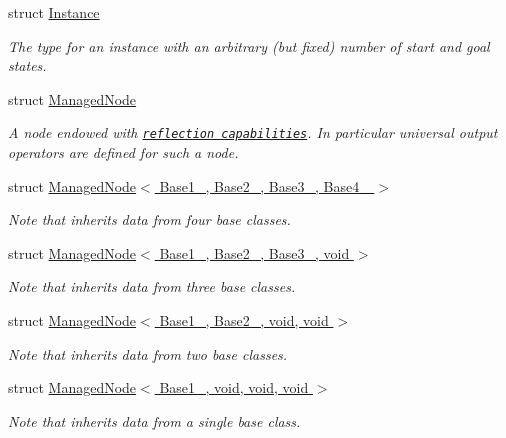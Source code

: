 \begin{DoxyCompactItemize}
struct \hyperlink{structslb_1_1core_1_1sb_1_1Instance}{Instance}
\begin{DoxyCompactList}\small\item\em The type for an instance with an arbitrary (but fixed) number of start and goal states. \end{DoxyCompactList}\item 
struct \hyperlink{structslb_1_1core_1_1sb_1_1ManagedNode}{Managed\+Node}
\begin{DoxyCompactList}\small\item\em A node endowed with \href{http://stackoverflow.com/a/11744832/2725810}{\tt reflection capabilities}. In particular universal output operators are defined for such a node. \end{DoxyCompactList}\item 
struct \hyperlink{structslb_1_1core_1_1sb_1_1ManagedNode_3_01Base1___00_01Base2___00_01Base3___00_01Base4___01_4}{Managed\+Node$<$ Base1\+\_\+, Base2\+\_\+, Base3\+\_\+, Base4\+\_\+ $>$}
\begin{DoxyCompactList}\small\item\em Note that inherits data from four base classes. \end{DoxyCompactList}\item 
struct \hyperlink{structslb_1_1core_1_1sb_1_1ManagedNode_3_01Base1___00_01Base2___00_01Base3___00_01void_01_4}{Managed\+Node$<$ Base1\+\_\+, Base2\+\_\+, Base3\+\_\+, void $>$}
\begin{DoxyCompactList}\small\item\em Note that inherits data from three base classes. \end{DoxyCompactList}\item 
struct \hyperlink{structslb_1_1core_1_1sb_1_1ManagedNode_3_01Base1___00_01Base2___00_01void_00_01void_01_4}{Managed\+Node$<$ Base1\+\_\+, Base2\+\_\+, void, void $>$}
\begin{DoxyCompactList}\small\item\em Note that inherits data from two base classes. \end{DoxyCompactList}\item 
struct \hyperlink{structslb_1_1core_1_1sb_1_1ManagedNode_3_01Base1___00_01void_00_01void_00_01void_01_4}{Managed\+Node$<$ Base1\+\_\+, void, void, void $>$}
\begin{DoxyCompactList}\small\item\em Note that inherits data from a single base class. \end{DoxyCompactList}\item 

\end{DoxyCompactItemize}
